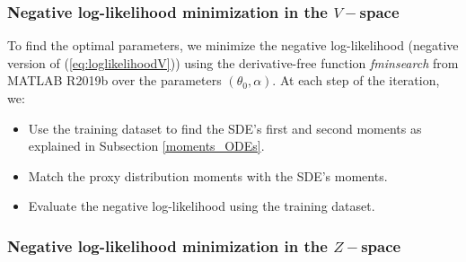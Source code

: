 \documentclass[11pt]{article}
\theoremstyle{definition}
\begin{document}
\subsubsection{Negative log-likelihood minimization in the $V-$space} \label{Sec:MinLH}

To find the optimal parameters, we minimize the negative log-likelihood (negative version of (\ref{eq:loglikelihoodV})) using the derivative-free function \textit{fminsearch} from MATLAB R2019b over the parameters $(\theta_0,\alpha)$. At each step of the iteration, we:
\begin{itemize}

\item Use the training dataset to find the SDE's first and second moments as explained in Subsection \ref{moments_ODEs}.
\item Match the proxy distribution moments with the SDE's moments.
\item Evaluate the negative log-likelihood using the training dataset.

\end{itemize}

\subsubsection{Negative log-likelihood minimization in the $Z-$space} \label{Sec:MinLHL}
\end{document}
